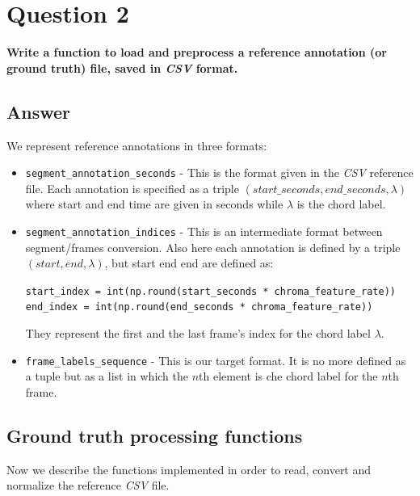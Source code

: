 \documentclass[
	12pt, %
]{fphw}
\begin{document}

\section*{\color{red}Question 2}

\begin{problem}
	\textbf{Write a function to load and preprocess a reference annotation (or ground truth) file, saved in \emph{CSV} format.}
\end{problem}

\subsection*{\color{blue}Answer} We represent reference annotations in three formats:
\begin{itemize}
	\item \verb|segment_annotation_seconds| - This is the format given in the \emph{CSV} reference file. Each annotation is specified as a triple $(start\_seconds, end\_seconds, \lambda)$ where start and end time are given in seconds while $\lambda$ is the chord label.
	\item \verb|segment_annotation_indices| - This is an intermediate format between segment/frames conversion. Also here each annotation is defined by a triple $(start, end, \lambda)$, but start end end are defined as:
	\begin{center}
		\verb|start_index = int(np.round(start_seconds * chroma_feature_rate))|
        \verb|end_index = int(np.round(end_seconds * chroma_feature_rate))|
	\end{center}	
They represent the first and the last frame's index for the chord label $\lambda$.
	\item \verb|frame_labels_sequence| - This is our target format. It is no more defined as a tuple but as a list in which the $n$th element is che chord label for the $n$th frame.
\end{itemize}

\subsection*{Ground truth processing functions}

Now we describe the functions implemented in order to read, convert and normalize the reference \emph{CSV} file.
\end{document}
